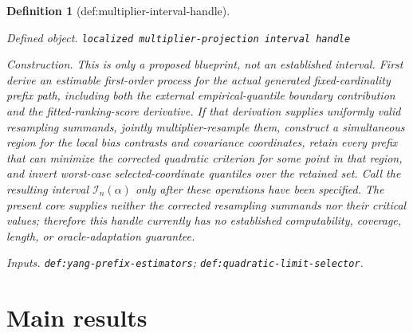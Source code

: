 \documentclass{article}
\newtheorem{definition}{Definition}
\begin{document}
\begin{definition}[def:multiplier-interval-handle]\label{def:multiplier-interval-handle}
\par\smallskip\noindent\emph{Defined object.} \texttt{localized multiplier-\allowbreak{}projection interval handle}
\par\smallskip\noindent\emph{Construction.} This is only a proposed blueprint, not an established interval.  First derive an estimable first-order process for the actual generated fixed-cardinality prefix path, including both the external empirical-quantile boundary contribution and the fitted-ranking-score derivative.  If that derivation supplies uniformly valid resampling summands, jointly multiplier-resample them, construct a simultaneous region for the local bias contrasts and covariance coordinates, retain every prefix that can minimize the corrected quadratic criterion for some point in that region, and invert worst-case selected-coordinate quantiles over the retained set.  Call the resulting interval \(\mathcal I_n(\alpha)\) only after these operations have been specified.  The present core supplies neither the corrected resampling summands nor their critical values; therefore this handle currently has no established computability, coverage, length, or oracle-adaptation guarantee.
\par\smallskip\noindent\emph{Inputs.} \texttt{def:\allowbreak{}yang-\allowbreak{}prefix-\allowbreak{}estimators}; \texttt{def:\allowbreak{}quadratic-\allowbreak{}limit-\allowbreak{}selector}.
\end{definition}

\section{Main results}
\end{document}
